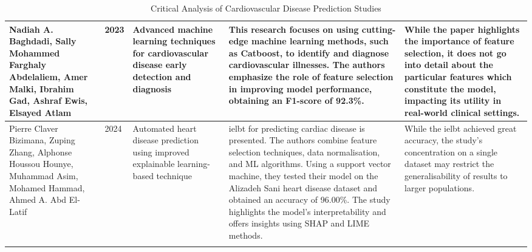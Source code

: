 \begin{longtable}{p{2.3cm}p{1cm}p{3cm}p{5.2cm}p{4.5cm}}
\hline
Nadiah A. Baghdadi, Sally Mohammed Farghaly Abdelaliem, Amer Malki, Ibrahim Gad, Ashraf Ewis, Elsayed Atlam & 2023 & Advanced machine learning techniques for cardiovascular disease early detection and diagnosis & This research focuses on using cutting-edge machine learning methods, such as Catboost, to identify and diagnose cardiovascular illnesses. The authors emphasize the role of feature selection in improving model performance, obtaining an F1-score of 92.3\%. & While the paper highlights the importance of feature selection, it does not go into detail about the particular features which constitute the model, impacting its utility in real-world clinical settings. \\
\hline
Pierre Claver Bizimana, Zuping Zhang, Alphonse Houssou Hounye, Muhammad Asim, Mohamed Hammad, Ahmed A. Abd El-Latif & 2024 & Automated heart disease prediction using improved explainable learning-based technique & \gls{ielbt} for predicting cardiac disease is presented. The authors combine feature selection techniques, data normalisation, and ML algorithms. Using a support vector machine, they tested their model on the Alizadeh Sani heart disease dataset and obtained an accuracy of 96.00\%.  The study highlights the model's interpretability and offers insights using SHAP and LIME methods. & While the \gls{ielbt} achieved great accuracy, the study's concentration on a single dataset may restrict the generalisability of results to larger populations.  \\
\hline
\caption{Critical Analysis of Cardiovascular Disease Prediction Studies}
\end{longtable}
\label{tab:heart_disease_studies}


